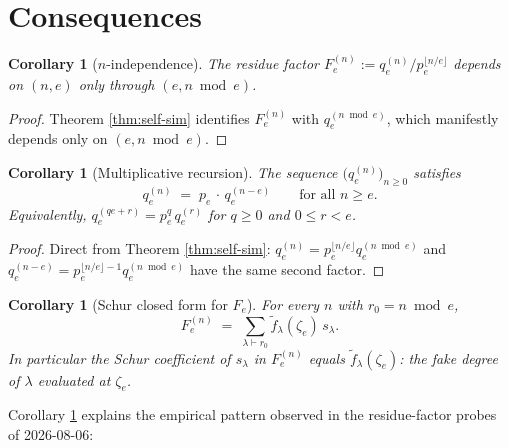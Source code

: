 \documentclass[11pt]{article}
\newtheorem{corollary}[theorem]{Corollary}
\theoremstyle{remark}
\newcommand{\ftilde}{\widetilde{f}}
\newcommand{\qe}{q_e}
\newcommand{\zetae}{\zeta_e}
\begin{document}
\section{Consequences}

\begin{corollary}[$n$-independence]\label{cor:n-ind}
The residue factor $F_e^{(n)} := \qe^{(n)}/p_e^{\lfloor n/e\rfloor}$ depends on $(n, e)$ only through $(e, n \bmod e)$.
\end{corollary}

\begin{proof}
Theorem \ref{thm:self-sim} identifies $F_e^{(n)}$ with $\qe^{(n \bmod e)}$, which manifestly depends only on $(e, n \bmod e)$.
\end{proof}

\begin{corollary}[Multiplicative recursion]\label{cor:recursion}
The sequence $\bigl(\qe^{(n)}\bigr)_{n \ge 0}$ satisfies
\[
  \qe^{(n)} \;=\; p_e\, \cdot\, \qe^{(n - e)} \qquad \text{for all } n \ge e.
\]
Equivalently, $\qe^{(qe + r)} = p_e^{q}\, \qe^{(r)}$ for $q \ge 0$ and $0 \le r < e$.
\end{corollary}

\begin{proof}
Direct from Theorem \ref{thm:self-sim}: $\qe^{(n)} = p_e^{\lfloor n/e\rfloor} \qe^{(n \bmod e)}$ and $\qe^{(n-e)} = p_e^{\lfloor n/e\rfloor - 1} \qe^{(n \bmod e)}$ have the same second factor.
\end{proof}

\begin{corollary}[Schur closed form for $F_e$]\label{cor:schur-closed}
For every $n$ with $r_0 = n \bmod e$,
\[
  F_e^{(n)} \;=\; \sum_{\lambda \vdash r_0} \ftilde_\lambda(\zetae)\, s_\lambda.
\]
In particular the Schur coefficient of $s_\lambda$ in $F_e^{(n)}$ equals $\ftilde_\lambda(\zetae)$: the fake degree of $\lambda$ evaluated at $\zetae$.
\end{corollary}

Corollary \ref{cor:schur-closed} explains the empirical pattern observed in the residue-factor probes of 2026-08-06:
\end{document}

